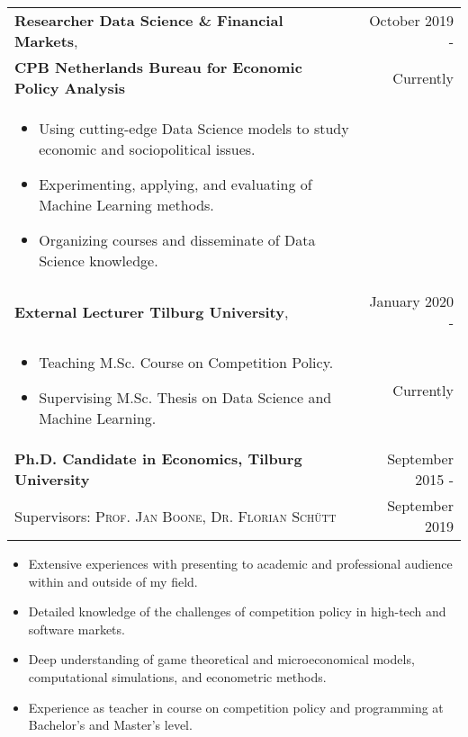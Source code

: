 \documentclass[a4paper,9pt]{article}
\begin{document}
\begin{tabular}{p{15cm} r}
  \textbf{Researcher Data Science \& Financial Markets}, &October 2019 -\\
  \textbf{CPB Netherlands Bureau for Economic Policy Analysis} &Currently\phantom{ -}\\
\begin{itemize}[noitemsep]
  \item Using cutting-edge Data Science models to study economic and sociopolitical issues.
  \item Experimenting, applying, and evaluating of Machine Learning methods.
  \item Organizing courses and disseminate of Data Science knowledge.
\end{itemize}\vspace{0.5em}\\
  \textbf{External Lecturer Tilburg University}, &January 2020 -\\
  \begin{itemize}
    \item Teaching M.Sc. Course on Competition Policy.
    \item Supervising M.Sc. Thesis on Data Science and Machine Learning.
  \end{itemize}&Currently\phantom{ -}\vspace{0.5em}\\
  \textbf{Ph.D. Candidate in Economics, Tilburg University} &September 2015 -\\
  Supervisors: \textsc{Prof. Jan Boone},  \textsc{Dr. Florian Schütt} & September 2019\phantom{ -}\\
\end{tabular}\vspace{0.5em}
\begin{itemize}[noitemsep]
  \item Extensive experiences with presenting to academic and professional audience within and outside of my field.
  \item Detailed knowledge of the challenges of competition policy in high-tech and software markets.
  \item Deep understanding of game theoretical and microeconomical models, computational simulations, and econometric methods.
  \item Experience as teacher in course on competition policy and programming at Bachelor's and Master's level.

\end{itemize}
\end{document}
